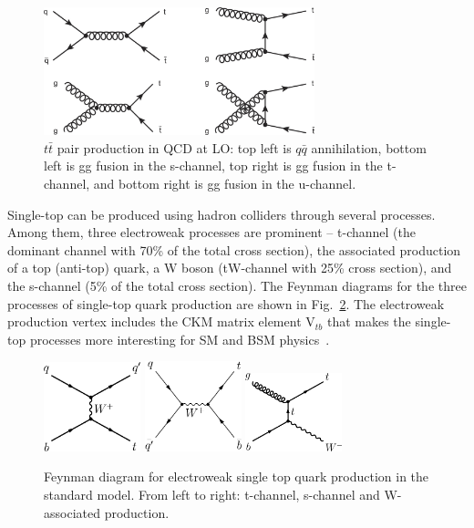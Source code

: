 \begin{figure}[h]
\centering
\includegraphics[width=0.7\textwidth]{fig/sm_beyond/ttbar_productions.jpg}
\caption{\label{fig:ttbar_prod}$t\bar{t}$ pair production in QCD at LO: top left is $q\bar{q}$ annihilation, bottom left is gg fusion in the s-channel, top right is gg fusion in the t-channel, and bottom right is gg fusion in the u-channel.}
\end{figure}

Single-top can be produced using hadron colliders through several processes. Among them, three electroweak processes are prominent – t-channel (the dominant channel with 70\% of the total cross section), the associated production of a top (anti-top) quark, a W boson (tW-channel with 25\% cross section), and the s-channel (5\% of the total cross section). The Feynman diagrams for the three processes of single-top quark production are shown in Fig.~\ref{fig:single_top_production}. The electroweak production vertex includes the CKM matrix element V$_{tb}$ that makes the single-top processes more interesting for SM and BSM physics~\cite{Giammanco:2015bxk}.
\begin{figure}
 \centering
 \includegraphics[width=0.25\textwidth]{fig/sm_beyond/tchannel22.pdf}\hfill
 \includegraphics[width=0.25\textwidth]{fig/sm_beyond/s-channel.pdf} \hfill
 \includegraphics[width=0.25\textwidth]{fig/sm_beyond/WtProduction.pdf}
\caption{Feynman diagram for electroweak single top quark production in the standard model. From left to right: t-channel, s-channel and W-associated production.}\label{fig:single_top_production}
\end{figure}
